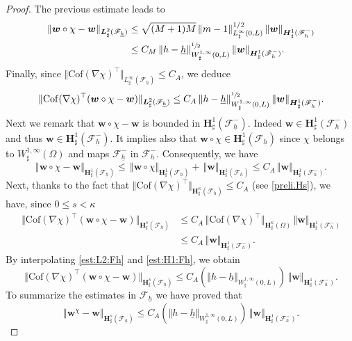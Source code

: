 \documentclass[10pt]{amsart}
\let\mathcal\mathscr
\theoremstyle{remark}
\theoremstyle{definition}
\newcommand{\norme}[1]{\,\Vert #1\Vert}
\newcommand{\vnorme}[1]{\Vert #1\Vert}
\newcommand{\wg}{\boldsymbol{w}}
\newcommand{\BS}[1]{\boldsymbol{#1}}
\newcommand{\hb}{{\underline{h}}}
\newcommand{\Cof}{\mathrm{Cof}}
\begin{document}
\begin{proof}
The previous estimate leads to
\[
\begin{aligned}
\norme{\wg\circ\chi-\wg}_{\BS{L}^{2}_{\sharp}(\mathcal{F}_{\hb})}&{}\leq \sqrt{(M+1)M}\norme{m-1}_{L^{\infty}_{\sharp}(0,L)}^{1/2}\norme{\wg}_{\BS{H}^{1}_{\sharp}(\mathcal{F}_{h}^{-})}\nonumber\\
&\leq C_M\norme{h-\hb}_{W^{1,\infty}_{\sharp}(0,L)}^{\sfrac{1}{2}}\norme{\wg}_{\BS{H}^{1}_{\sharp}(\mathcal{F}_{h}^{-})}.
\end{aligned}
\]
Finally, since $\vnorme{\Cof(\nabla\chi)^{\top}}_{L^\infty_\sharp(\mathcal{F}_{\hb})}\leq C_A$, we deduce
\begin{equation}
\label{est:L2:Fh}
\norme{\Cof(\nabla\chi)^{\top}(\wg\circ\chi-\wg)}_{\BS{L}^{2}_{\sharp}(\mathcal{F}_{\hb})}\leq C_A\norme{h-\hb}_{W^{1,\infty}_{\sharp}(0,L)}^{\sfrac{1}{2}}\norme{\wg}_{\BS{H}^{1}_{\sharp}(\mathcal{F}_{h}^{-})}.
\end{equation}
Next we remark that $\wg\circ\chi - \wg$ is bounded in $\BS{H}_{\sharp}^1(\mathcal{F}^{-}_{\hb})$. Indeed $\wg\in \BS{H}_{\sharp}^1(\mathcal{F}^-_{h})$ and thus $\wg\in \BS{H}_{\sharp}^1(\mathcal{F}^{-}_{\hb})$. It implies also that $\wg\circ\chi \in \BS{H}_{\sharp}^1(\mathcal{F}_{\hb})$ since $\chi$ belongs to $W_{\sharp}^{1, \infty}(\Omega)$ and maps $\mathcal{F}^-_{\hb}$ in $\mathcal{F}^-_{h}$. Consequently, we have
\[
\norme{\wg\circ\chi - \wg}_{\BS{H}^{1}_{\sharp}(\mathcal{F}_{\hb})}\leq \norme{\wg\circ\chi}_{\BS{H}^{1}_{\sharp}(\mathcal{F}_{\hb})} + \norme{\wg}_{\BS{H}^{1}_{\sharp}(\mathcal{F}_{\hb})} \leq C_{A}\norme{\wg}_{\BS{H}^{1}_{\sharp}(\mathcal{F}^{-}_{h})}.
\]
Next, thanks to the fact that $\vnorme{\Cof(\nabla\chi)^{\top}}_{\BS{H}^\kappa_\sharp(\mathcal{F}_{\hb})}\leq C_A$ (see \eqref{preli.Hs}), we have, since $0\leq s<\kappa$
\begin{equation}
\begin{aligned}
\norme{\Cof(\nabla\chi)^{\top}(\wg\circ\chi - \wg)}_{\BS{H}^{s}_{\sharp}(\mathcal{F}_{\hb})}& \leq C_{A}{\norme{\Cof(\nabla\chi)^{\top}}_{\BS{H}^{\kappa}_{\sharp}(\Omega)}}\norme{\wg}_{\BS{H}^{1}_{\sharp}(\mathcal{F}^{-}_{h})} \\
& \leq C_{A}\norme{\wg}_{\BS{H}^{1}_{\sharp}(\mathcal{F}^{-}_{h})}.
\end{aligned}\label{est:H1:Fh}
\end{equation}
By interpolating \eqref{est:L2:Fh} and \eqref{est:H1:Fh}, we obtain
\[
\norme{\Cof(\nabla\chi)^{\top}(\wg\circ\chi - \wg)}_{\BS{H}^{s}_{\sharp}(\mathcal{F}_{\hb})}\leq C_A(\vnorme{h-\hb}_{W^{1,\infty}_{\sharp}(0,L)})\norme{\wg}_{\BS{H}^{1}_{\sharp}(\mathcal{F}^{-}_{h})}.
\]
To summarize the estimates in $\mathcal{F}_{\hb}$ we have proved that
\begin{equation} \label{eq.milieu}
\norme{\wg^\chi-\wg}_{\BS{H}^{s}_{\sharp}(\mathcal{F}_{\hb})}\leq C_A(\vnorme{h-\hb}_{W^{1,\infty}_{\sharp}(0,L)})\norme{\wg}_{\BS{H}^{1}_{\sharp}(\mathcal{F}^{-}_{h})}.
\end{equation}


\end{proof}
\end{document}
